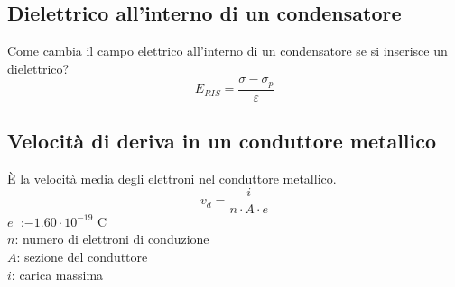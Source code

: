 \subsection{Dielettrico all'interno di un condensatore}
Come cambia il campo elettrico all'interno di un condensatore se si inserisce un dielettrico?
\begin{equation*}
E_{RIS} = \frac{\sigma-\sigma_p}{\varepsilon}
\end{equation*}

\subsection{Velocità di deriva in un conduttore metallico}
È la velocità media degli elettroni nel conduttore metallico.
\begin{equation*}
  v_d = \frac{i}{n\cdot A\cdot e}
\end{equation*}
\hyperref[tab:e-]{$e^-$}:$-1.60\cdot10^{-19}$ C\\
$n$: numero di elettroni di conduzione\\
$A$: sezione del conduttore\\
$i$: carica massima

